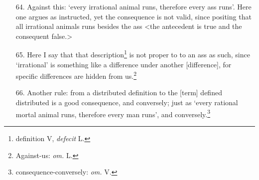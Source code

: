 \documentclass[]{article}
\begin{document}
\begin{enumerate}
	\item[64.] Against this: `every irrational animal runs, therefore every ass runs'. Here one argues as instructed, yet the consequence is not valid, since positing that all irrational animals runs besides the ass <the antecedent is true and the consequent false.>
	\item[65.] Here I say that that description\footnote{definition V, \textit{defecit} L.} is not proper to to an ass as such, since `irrational' is something like a difference under another [difference], for specific differences are hidden from us.\footnote{Against-us: \textit{om.} L.} 
	\item[66.] Another rule: from a distributed definition to the [term] defined distributed is a good consequence, and conversely; just as `every rational mortal animal runs, therefore every man runs', and conversely.\footnote{consequence-conversely: \textit{om.} V.}
\end{enumerate}
\end{document}
